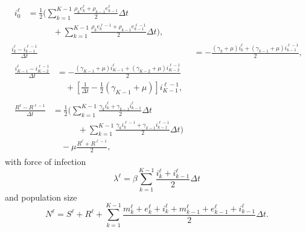 \documentclass{jpmarticle}
\let\subequationsorig\subequations%
\let\endsubequationsorig\endsubequations%
\renewenvironment{subequations}{
  \subequationsorig
  \renewcommand{\theequation}{\theparentequation.\arabic{equation}}
}{
  \endsubequationsorig
}
\begin{document}
\begin{subequations}
\begin{align}
    \\
    \begin{split}
      i_0^{\ell} &=
      \frac{1}{2} \Bigg(
      \sum_{k = 1}^{K - 1}
      \frac{\rho_k e_k^{\ell} + \rho_{k - 1} e_{k - 1}^{\ell}}{2}
      \Delta t
      \\ & \quad\quad\quad {}
      + \sum_{k = 1}^{K - 1}
      \frac{\rho_k e_k^{\ell - 1} + \rho_{k - 1} e_{k - 1}^{\ell - 1}}{2}
      \Delta t
      \Bigg),
    \end{split}
    \\
    \frac{i_k^{\ell} - i_{k - 1}^{\ell - 1}}{\Delta t} &=
    - \frac{(\gamma_k + \mu) i_k^{\ell}
      + (\gamma_{k - 1} + \mu) i_{k - 1}^{\ell - 1}}{2},
    \\
    \begin{split}
      \frac{i_{K - 1}^{\ell} - i_{K - 2}^{\ell - 1}}{\Delta t} &=
      - \frac{(\gamma_{K - 1} + \mu) i_{K - 1}^{\ell}
        + (\gamma_{K - 2} + \mu) i_{K - 2}^{\ell - 1}}{2}
      \\ & \quad {}
      + \left[\frac{1}{\Delta t}
        - \frac{1}{2} (\gamma_{K - 1} + \mu)\right]
      i_{K - 1}^{\ell - 1},
    \end{split}
    \\
    \begin{split}
      \frac{R^{\ell} - R^{\ell - 1}}{\Delta t} &=
      \frac{1}{2} \Bigg(
      \sum_{k = 1}^{K - 1}
      \frac{\gamma_k i_k^{\ell} + \gamma_{k - 1} i_{k - 1}^{\ell}}{2}
      \Delta t
      \\ & \quad\quad\quad {}
      + \sum_{k = 1}^{K - 1}
      \frac{\gamma_k i_k^{\ell - 1} + \gamma_{k - 1} i_{k - 1}^{\ell - 1}}{2}
      \Delta t
      \Bigg)
      \\ & \quad {}
      - \mu \frac{R^{\ell} + R^{\ell - 1}}{2},
    \end{split}
  \end{align}
  with force of infection
  \begin{equation}
    \lambda^{\ell} =
    \beta \sum_{k = 1}^{K - 1}
    \frac{i_k^{\ell} + i_{k - 1}^{\ell}}{2}
    \Delta t
  \end{equation}
  and population size
  \begin{equation}
    N^{\ell} =
    S^{\ell} + R^{\ell}
    + \sum_{k = 1}^{K - 1}
    \frac{m_k^{\ell} + e_k^{\ell} + i_k^{\ell}
      + m_{k - 1}^{\ell} + e_{k - 1}^{\ell} + i_{k - 1}^{\ell}}
    {2}
    \Delta t.
  \end{equation}
\end{subequations}
\end{document}
